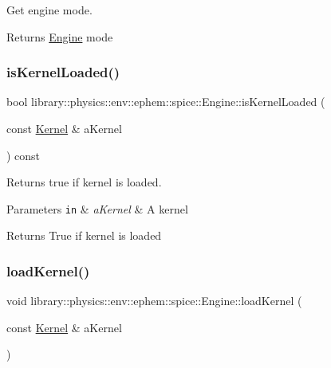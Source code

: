 Get engine mode. 

\begin{DoxyReturn}{Returns}
\hyperlink{classlibrary_1_1physics_1_1env_1_1ephem_1_1spice_1_1_engine}{Engine} mode 
\end{DoxyReturn}
\mbox{\label{classlibrary_1_1physics_1_1env_1_1ephem_1_1spice_1_1_engine_a36cc8408d86696192a623eb4bc4f41cc}} 
\subsubsection{\texorpdfstring{is\+Kernel\+Loaded()}{isKernelLoaded()}}
{\footnotesize\ttfamily bool library\+::physics\+::env\+::ephem\+::spice\+::\+Engine\+::is\+Kernel\+Loaded (\begin{DoxyParamCaption}\item[{const \hyperlink{classlibrary_1_1physics_1_1env_1_1ephem_1_1spice_1_1_kernel}{Kernel} \&}]{a\+Kernel }\end{DoxyParamCaption}) const}



Returns true if kernel is loaded. 


\begin{DoxyParams}[1]{Parameters}
\mbox{\tt in}  & {\em a\+Kernel} & A kernel \\
\hline
\end{DoxyParams}
\begin{DoxyReturn}{Returns}
True if kernel is loaded 
\end{DoxyReturn}
\mbox{\label{classlibrary_1_1physics_1_1env_1_1ephem_1_1spice_1_1_engine_ad4bc48d95aadb38a755e2aaf60acaf55}} 
\subsubsection{\texorpdfstring{load\+Kernel()}{loadKernel()}}
{\footnotesize\ttfamily void library\+::physics\+::env\+::ephem\+::spice\+::\+Engine\+::load\+Kernel (\begin{DoxyParamCaption}\item[{const \hyperlink{classlibrary_1_1physics_1_1env_1_1ephem_1_1spice_1_1_kernel}{Kernel} \&}]{a\+Kernel }\end{DoxyParamCaption})}



